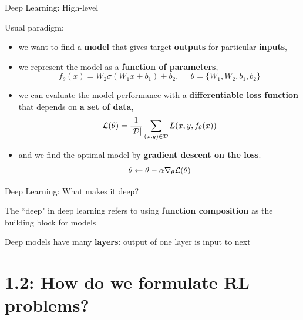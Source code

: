 \documentclass[9pt]{beamer}
\begin{document}
\begin{frame}{Deep Learning: High-level}

Usual paradigm:
%
\begin{itemize}
\item we want to find a \textbf{model} that gives target \textbf{outputs} for particular \textbf{inputs},
\item we represent the model as a \textbf{function of parameters},
\begin{equation*}
f_{\theta}(x) = W_2 \sigma\left( W_1 x + b_1 \right) + b_2, \;\;\;\;\; \theta = \{W_1, W_2, b_1, b_2\}
\end{equation*}
\item we can evaluate the model performance with a \textbf{differentiable loss function} that depends on \textbf{a set of data},
\begin{equation*}
{\mathcal L}(\theta) = \frac{1}{|{\mathcal D}|}\sum_{(x,y)\in{\mathcal D}} L(x,y,f_{\theta}(x))
\end{equation*}
\item and we find the optimal model by \textbf{gradient descent on the loss}.
\begin{equation*}
\theta \leftarrow \theta - \alpha \nabla_{\theta} {\mathcal L}(\theta)
\end{equation*}
\end{itemize}

\end{frame}

\begin{frame}{Deep Learning: What makes it deep?}

The ``deep" in deep learning refers to using \textbf{function composition} as the building block for models

Deep models have many \textbf{layers}: output of one layer is input to next

\end{frame}

\section{1.2: How do we formulate RL problems?}
\end{document}
